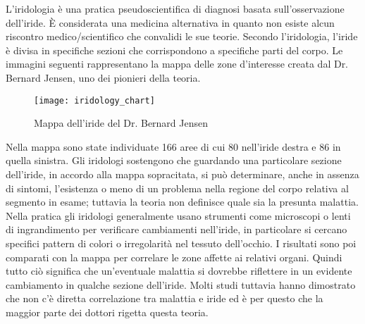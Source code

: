 L’iridologia è una pratica pseudoscientifica di diagnosi basata sull’osservazione dell’iride.  È considerata una medicina alternativa in quanto non esiste alcun riscontro medico/scientifico che convalidi le sue teorie.  Secondo l’iridologia, l’iride è divisa in specifiche sezioni che corrispondono a specifiche parti del corpo. Le immagini seguenti rappresentano la mappa delle zone d’interesse creata dal Dr. Bernard Jensen, uno dei pionieri della teoria.
\begin{figure}[h]
  \centering
  \texttt{[image: iridology\_chart]}
  \caption{Mappa dell'iride del Dr. Bernard Jensen}
\end{figure}

Nella mappa sono state individuate 166 aree di cui 80 nell’iride destra e 86 in quella sinistra. Gli iridologi sostengono che guardando una particolare sezione dell’iride, in accordo alla mappa sopracitata, si può determinare, anche in assenza di sintomi, l’esistenza o meno di un problema nella regione del corpo relativa al segmento in esame; tuttavia la teoria non definisce quale sia la presunta malattia. Nella pratica gli iridologi generalmente usano strumenti come microscopi o lenti di ingrandimento per verificare cambiamenti nell’iride, in particolare si cercano specifici pattern di colori o irregolarità nel tessuto dell’occhio. I risultati sono poi comparati con la mappa per correlare le zone affette ai relativi organi. 
Quindi tutto ciò significa che un’eventuale malattia si dovrebbe riflettere in un evidente cambiamento in qualche sezione dell’iride. Molti studi tuttavia hanno dimostrato che non c’è diretta correlazione tra malattia e iride ed è per questo che la maggior parte dei dottori rigetta questa teoria. 
